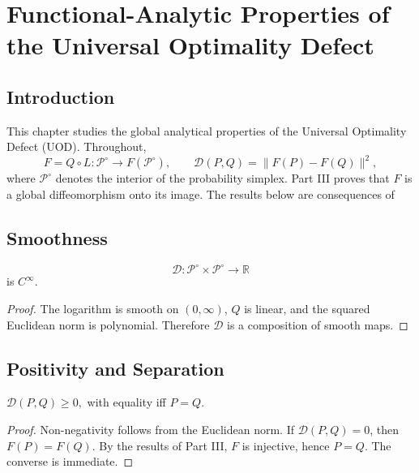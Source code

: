 \chapter[Functional-Analytic Properties]{Functional-Analytic Properties of the Universal Optimality Defect}
\section{Introduction}
This chapter studies the global analytical properties of the Universal
Optimality Defect (UOD). Throughout,
\[
F=Q\circ L:\mathcal P^\circ\rightarrow F(\mathcal P^\circ),
\qquad \mathcal D(P,Q)=\|F(P)-F(Q)\|^2,
\]
where \(\mathcal P^\circ\) denotes the interior of the
probability simplex. Part III proves that \(F\) is a global
diffeomorphism onto its image. The results below are consequences of
\section{Smoothness}
\begin{theorem}[Smoothness]
\label{ch:thm:23-1}
\[
\mathcal D:\mathcal P^\circ\times\mathcal P^\circ\rightarrow\mathbb R
\]
is \(C^\infty\).
\end{theorem}
\begin{proof} The logarithm is smooth on \((0,\infty)\), \(Q\) is
linear, and the squared Euclidean norm is polynomial. Therefore
\(\mathcal D\) is a composition of smooth maps. 
\end{proof}
\section{Positivity and Separation}
\begin{theorem}[Positivity]
\label{ch:thm:23-2}
$\mathcal D(P,Q)\ge0,$
with equality iff \(P=Q\).
\end{theorem}
\begin{proof} Non-negativity follows from the Euclidean norm. If
\(\mathcal D(P,Q)=0\), then \(F(P)=F(Q)\). By the results of Part III, \(F\) is
injective, hence \(P=Q\). The converse is immediate. 
\end{proof}

